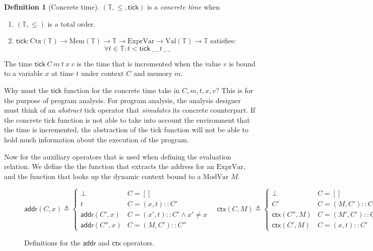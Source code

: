 \documentclass[acmsmall,review]{acmart}\settopmatter{printfolios=true,printccs=false,printacmref=false}
\theoremstyle{definition}
\newtheorem{definition}{Definition}[section]
\newcommand*{\cons}{::}
\newcommand*{\ExprVar}{\text{ExprVar}}
\newcommand*{\ModVar}{\text{ModVar}}
\newcommand*{\Time}{\mathbb{T}}
\newcommand*{\Ctx}[1]{\text{Ctx}({#1})}
\newcommand*{\Value}[1]{\text{Val}({#1})}
\newcommand*{\Mem}[1]{\text{Mem}({#1})}
\newcommand*{\mem}{m}
\newcommand*{\addr}{\mathsf{addr}}
\newcommand*{\tick}{\mathsf{tick}}
\newcommand*{\modctx}{\mathsf{ctx}}
\begin{document}
\begin{definition}[Concrete time]
  $(\Time, \le, \tick)$ is a \emph{concrete time} when
  \begin{enumerate}
    \item $(\Time, \le)$ is a total order.
    \item $\tick : \Ctx{\Time}\rightarrow\Mem{\Time}\rightarrow\Time\rightarrow\ExprVar\rightarrow\Value{\Time}\rightarrow\Time$ satisfies:
          \[\forall t\in\Time: t < \tick\:\_\:\_\:t\:\_\:\_\]
  \end{enumerate}
\end{definition}
The time $\tick\:C\:\mem\:t\:x\:v$ is the time that is incremented when the value $v$ is bound to a variable $x$ at time $t$ under context $C$ and memory $m$.

Why must the $\tick$ function for the concrete time take in $C, m, t, x, v$?
This is for the purpose of program analysis.
For program analysis, the analysis designer must think of an \emph{abstract} tick operator that \emph{simulates} its concrete counterpart.
If the concrete tick function is not able to take into account the environment that the time is incremented, the abstraction of the tick function will not be able to hold much information about the execution of the program.

Now for the auxiliary operators that is used when defining the evaluation relation.
We define the the function that extracts the address for an $\ExprVar$,
and the function that looks up the dynamic context bound to a $\ModVar$ $M$.

\begin{figure}[h!]
  \centering
  \footnotesize
  \[
    \addr(C,x)\triangleq
    \begin{cases}
      \bot         & C=[]                              \\
      t            & C=(x, t)\cons C'                  \\
      \addr(C',x)  & C=(x', t)\cons C' \wedge x'\neq x \\
      \addr(C'',x) & C=(M, C')\cons C''
    \end{cases}
    \quad
    \modctx(C,M)\triangleq
    \begin{cases}
      \bot           & C=[]                               \\
      C'             & C=(M, C')\cons C''                 \\
      \modctx(C'',M) & C=(M', C')\cons C''\wedge M'\neq M \\
      \modctx(C',M)  & C=(x, t)\cons C'
    \end{cases}
  \]
  \caption{Definitions for the $\addr$ and $\modctx$ operators.}
\end{figure}
\end{document}
